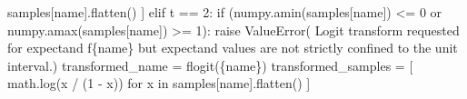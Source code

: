 \documentclass[
  letterpaper,
  DIV=11,
  numbers=noendperiod]{scrartcl}
\newenvironment{Shaded}{\begin{snugshade}}{\end{snugshade}}
\newcommand{\ControlFlowTok}[1]{\textcolor[rgb]{0.00,0.23,0.31}{#1}}
\newcommand{\DecValTok}[1]{\textcolor[rgb]{0.68,0.00,0.00}{#1}}
\newcommand{\KeywordTok}[1]{\textcolor[rgb]{0.00,0.23,0.31}{#1}}
\newcommand{\NormalTok}[1]{\textcolor[rgb]{0.00,0.23,0.31}{#1}}
\newcommand{\OperatorTok}[1]{\textcolor[rgb]{0.37,0.37,0.37}{#1}}
\newcommand{\PreprocessorTok}[1]{\textcolor[rgb]{0.68,0.00,0.00}{#1}}
\newcommand{\SpecialCharTok}[1]{\textcolor[rgb]{0.37,0.37,0.37}{#1}}
\newcommand{\SpecialStringTok}[1]{\textcolor[rgb]{0.13,0.47,0.30}{#1}}
\newcommand{\StringTok}[1]{\textcolor[rgb]{0.13,0.47,0.30}{#1}}
\begin{document}
\begin{Shaded}
\begin{Highlighting}[]
\NormalTok{                            samples[name].flatten() ]}
  \ControlFlowTok{elif}\NormalTok{ t }\OperatorTok{==} \DecValTok{2}\NormalTok{:}
    \ControlFlowTok{if}\NormalTok{ (numpy.amin(samples[name]) }\OperatorTok{\textless{}=} \DecValTok{0} \KeywordTok{or}
\NormalTok{          numpy.amax(samples[name]) }\OperatorTok{\textgreater{}=} \DecValTok{1}\NormalTok{):}
      \ControlFlowTok{raise} \PreprocessorTok{ValueError}\NormalTok{( }\StringTok{\textquotesingle{}Logit transform requested for expectand \textquotesingle{}}
                       \SpecialStringTok{f\textquotesingle{}}\SpecialCharTok{\{}\NormalTok{name}\SpecialCharTok{\}}\SpecialStringTok{ but expectand values are not strictly \textquotesingle{}}
                        \StringTok{\textquotesingle{}confined to the unit interval.\textquotesingle{}}\NormalTok{)}
\NormalTok{    transformed\_name }\OperatorTok{=} \SpecialStringTok{f\textquotesingle{}logit(}\SpecialCharTok{\{}\NormalTok{name}\SpecialCharTok{\}}\SpecialStringTok{)\textquotesingle{}}
\NormalTok{    transformed\_samples }\OperatorTok{=}\NormalTok{ [ math.log(x }\OperatorTok{/}\NormalTok{ (}\DecValTok{1} \OperatorTok{{-}}\NormalTok{ x)) }\ControlFlowTok{for}\NormalTok{ x }\KeywordTok{in}
\NormalTok{                            samples[name].flatten() ]}
\end{Highlighting}
\end{Shaded}
\end{document}
